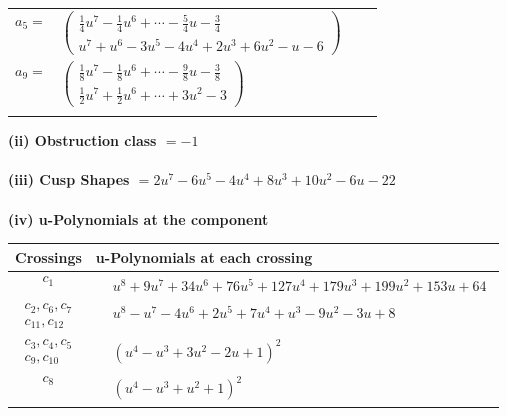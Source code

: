 \documentclass[1p]{elsarticle_modified}
\theoremstyle{definition}
\begin{document}
\begin{tabular}{m{7pt} m{180pt} m{7pt} m{180pt} }
\flushright $a_{5}=$&$\begin{pmatrix}\frac{1}{4} u^7-\frac{1}{4} u^6+\cdots-\frac{5}{4} u-\frac{3}{4}\\u^7+u^6-3 u^5-4 u^4+2 u^3+6 u^2- u-6\end{pmatrix}$ \\
\flushright $a_{9}=$&$\begin{pmatrix}\frac{1}{8} u^7-\frac{1}{8} u^6+\cdots-\frac{9}{8} u-\frac{3}{8}\\\frac{1}{2} u^7+\frac{1}{2} u^6+\cdots+3 u^2-3\end{pmatrix}$\\&\end{tabular}
\flushleft \textbf{(ii) Obstruction class $= -1$}\\~\\
\flushleft \textbf{(iii) Cusp Shapes $= 2 u^7-6 u^5-4 u^4+8 u^3+10 u^2-6 u-22$}\\~\\
\newpage\renewcommand{\arraystretch}{1}
\flushleft \textbf{(iv) u-Polynomials at the component}\newline \\
\begin{tabular}{m{50pt}|m{274pt}}
Crossings & \hspace{64pt}u-Polynomials at each crossing \\
\hline $$\begin{aligned}c_{1}\end{aligned}$$&$\begin{aligned}
&u^8+9 u^7+34 u^6+76 u^5+127 u^4+179 u^3+199 u^2+153 u+64
\end{aligned}$\\
\hline $$\begin{aligned}c_{2},c_{6},c_{7}\\c_{11},c_{12}\end{aligned}$$&$\begin{aligned}
&u^8- u^7-4 u^6+2 u^5+7 u^4+u^3-9 u^2-3 u+8
\end{aligned}$\\
\hline $$\begin{aligned}c_{3},c_{4},c_{5}\\c_{9},c_{10}\end{aligned}$$&$\begin{aligned}
&(u^4- u^3+3 u^2-2 u+1)^2
\end{aligned}$\\
\hline $$\begin{aligned}c_{8}\end{aligned}$$&$\begin{aligned}
&(u^4- u^3+u^2+1)^2
\end{aligned}$\\
\hline
\end{tabular}\\~\\
\end{document}
